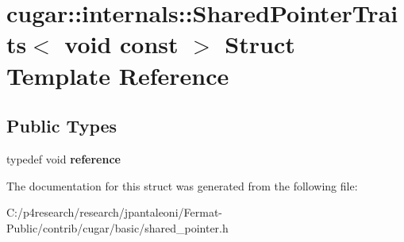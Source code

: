 \hypertarget{structcugar_1_1internals_1_1_shared_pointer_traits_3_01void_01const_01_4}{}\section{cugar\+:\+:internals\+:\+:Shared\+Pointer\+Traits$<$ void const $>$ Struct Template Reference}
\label{structcugar_1_1internals_1_1_shared_pointer_traits_3_01void_01const_01_4}
\subsection*{Public Types}
\begin{DoxyCompactItemize}
\item 
\mbox{\label{structcugar_1_1internals_1_1_shared_pointer_traits_3_01void_01const_01_4_a4064edbedec8ad7cd46f52d397233ca2}} 
typedef void {\bfseries reference}
\end{DoxyCompactItemize}


The documentation for this struct was generated from the following file\+:\begin{DoxyCompactItemize}
\item 
C\+:/p4research/research/jpantaleoni/\+Fermat-\/\+Public/contrib/cugar/basic/shared\+\_\+pointer.\+h\end{DoxyCompactItemize}

